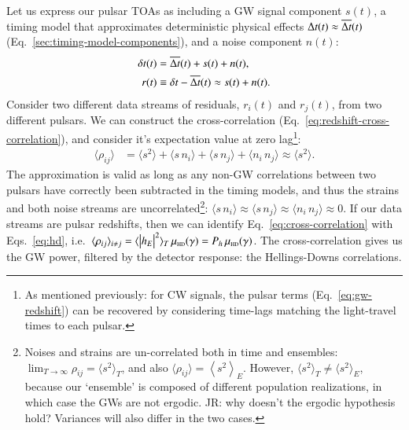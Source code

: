 \documentclass[onecolumn,authoryear]{els-mrw}
\begin{document}
Let us express our pulsar TOAs as including a GW signal component $s(t)$, a timing model that approximates deterministic physical effects ${\Delta{}t}(t) \approx \overline{{\Delta{}t}}(t)$ (Eq.~\ref{sec:timing-model-components}), and a noise component $n(t)$:
\begin{align}\label{eq:toa-components-gw}
    {\delta{}t}(t) & = \overline{{\Delta{}t}}(t) + s(t) + n(t), \\
    r(t) & \equiv {\delta{}t} - \overline{{\Delta{}t}}(t) \approx s(t) + n(t).
\end{align}
Consider two different data streams of residuals, $r_i(t)$ and $r_j(t)$, from two different pulsars.  We can construct the cross-correlation (Eq.~\ref{eq:redshift-cross-correlation}), and consider it's expectation value at zero lag\footnote{As mentioned previously: for CW signals, the pulsar terms (Eq.~\ref{eq:gw-redshift}) can be recovered by considering time-lags matching the light-travel times to each pulsar.}:
\begin{align}\label{eq:cross-correlation}
    \langle \rho_{ij} \rangle & = \langle s^2 \rangle + \langle s \, n_i \rangle + \langle s \, n_j \rangle + \langle n_i \, n_j \rangle \approx \langle s^2 \rangle.
\end{align}
The approximation is valid as long as any non-GW correlations between two pulsars have correctly been subtracted in the timing models, and thus the strains and both noise streams are uncorrelated\footnote{Noises and strains are un-correlated both in time and ensembles: $\lim_{T \rightarrow \infty} \rho_{ij} = \langle s^2 \rangle_T$, and also \mbox{$\langle \rho_{ij} \rangle = \left< s^2 \right>_E$}.  However, $\langle s^2 \rangle_T \neq \langle s^2 \rangle_E$, because our `ensemble' is composed of different population realizations, in which case the GWs are not ergodic. {\color{red}JR: why doesn't the ergodic hypothesis hold?} Variances will also differ in the two cases.}: \mbox{$\langle s \, n_i \rangle \approx \langle s \, n_j \rangle \approx \langle n_i \, n_j \rangle \approx 0$}.  If our data streams are pulsar redshifts, then we can identify Eq.~\ref{eq:cross-correlation} with Eqs.~\ref{eq:hd}, i.e.~\mbox{$\langle \rho_{ij} \rangle_{i \neq j} = \langle \big| h_E \big|^2 \rangle_T \, \hdfunc(\gamma) = P_h \, \hdfunc(\gamma)$}.  The cross-correlation gives us the GW power, filtered by the detector response: the Hellings-Downs correlations.
\end{document}
